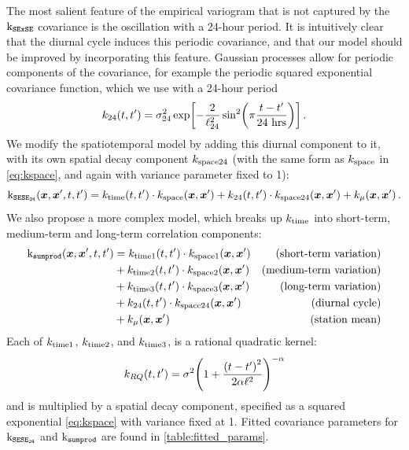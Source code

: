 \documentclass[12pt]{article}
\begin{document}
The most salient feature of the empirical variogram that is not captured by the \(\operatorname{k_{\mathtt{SExSE}}}\) covariance is the oscillation with a 24-hour period.
It is intuitively clear that the diurnal cycle induces this periodic covariance, and that our model should be improved by incorporating this feature.
Gaussian processes allow for periodic components of the covariance, for example the periodic squared exponential covariance function, which we use with a 24-hour period
\begin{equation}
    k_{24}(t,t') = \sigma_{24}^2 \exp\sbr{ - \frac{2}{\ell_{24}^2} \sin^2\del{
        \pi \frac{t-t'}{\text{24 hrs}} 
        }}\,.
\end{equation}
We modify the spatiotemporal model by adding this diurnal component to it, with its own spatial decay component \(k_{\mathrm{space}{}24}\) (with the same form as \(k_{\mathrm{space}}\) in \autoref{eq:kspace}, and again with variance parameter fixed to 1):
\begin{equation}
    \operatorname{k_{\mathtt{SESE_{24}}}}(\bm{x},\bm{x}',t,t') = k_{\mathrm{time}}(t,t') \cdot k_{\mathrm{space}}(\bm{x}, \bm{x}') 
        + k_{24}(t,t') \cdot k_{\mathrm{space}{}24}(\bm{x}, \bm{x}')
        + k_\mu(\bm{x}, \bm{x}') 
        \,.
\end{equation}
We also propose a more complex model, which breaks up \(k_{\mathrm{time}}\) into short-term, medium-term and long-term correlation components:
\begin{equation}
\begin{aligned}
    \operatorname{k_{\mathtt{sumprod}}}(\bm{x},\bm{x}',t,t') &= 
           k_{\mathrm{time}{}1}(t,t') \cdot k_{\mathrm{space}{}1}(\bm{x}, \bm{x}')  &\text{(short-term variation)} \\
        &+ k_{\mathrm{time}{}2}(t,t') \cdot k_{\mathrm{space}{}2}(\bm{x}, \bm{x}')  &\text{(medium-term variation)} \\
        &+ k_{\mathrm{time}{}3}(t,t') \cdot k_{\mathrm{space}{}3}(\bm{x}, \bm{x}')  &\text{(long-term variation)} \\
        &+ k_{24}(t,t') \cdot k_{\mathrm{space}{}24}(\bm{x}, \bm{x}') &\text{(diurnal cycle)} \\
        &+ k_\mu(\bm{x}, \bm{x}') &\text{(station mean)}
\end{aligned}
\label{eq:sumprod_kernel}
\end{equation}
Each of \(k_{\mathrm{time}{}1}\), \(k_{\mathrm{time}{}2}\), and \(k_{\mathrm{time}{}3}\), is a rational quadratic kernel:
\begin{equation}
    k_{RQ}(t,t') = \sigma^2 \del{1 + \frac{\del{t-t'}^2}{2\alpha\ell^2} }^{-\alpha}
\end{equation}
and is multiplied by a spatial decay component, specified as a squared exponential \autoref{eq:kspace} with variance fixed at 1.
Fitted covariance parameters for \(\operatorname{k_{\mathtt{SESE_{24}}}}\) and \(\operatorname{k_{\mathtt{sumprod}}}\) are found in \autoref{table:fitted_params}.
\end{document}
